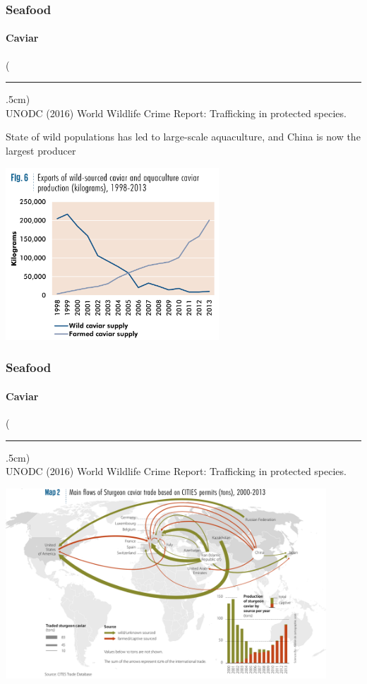 \documentclass[10pt]{beamer}
\newenvironment{reference}[2]{%
	\begin{textblock*}{\textwidth}(#1,#2)
		\tiny\bgroup\color{gray}}{\egroup\end{textblock*}}
\begin{document}
\begin{frame}[t]
\frametitle{Seafood}
\framesubtitle{Caviar}
\vspace{0.5cm}

	\begin{reference}{4mm}{92mm}
		\rule{1.5cm}{0.25pt}\\
		UNODC (2016) World Wildlife Crime Report: Trafficking in protected species.
	\end{reference}
	
	State of wild populations has led to large-scale aquaculture, and China is now the largest producer\\
	
	\vspace{0.5cm}
	
	\begin{center}
		\includegraphics[width=0.6\textwidth]{figures/aquaculture.png}
	\end{center}
\end{frame}


\begin{frame}[t]
\frametitle{Seafood}
\framesubtitle{Caviar}
\vspace{0.5cm}

	\begin{reference}{4mm}{92mm}
		\rule{1.5cm}{0.25pt}\\
		UNODC (2016) World Wildlife Crime Report: Trafficking in protected species.
	\end{reference}
	
	\begin{center}
		\includegraphics[width=0.9\textwidth]{figures/map7b.png}
	\end{center}
\end{frame}
\end{document}
